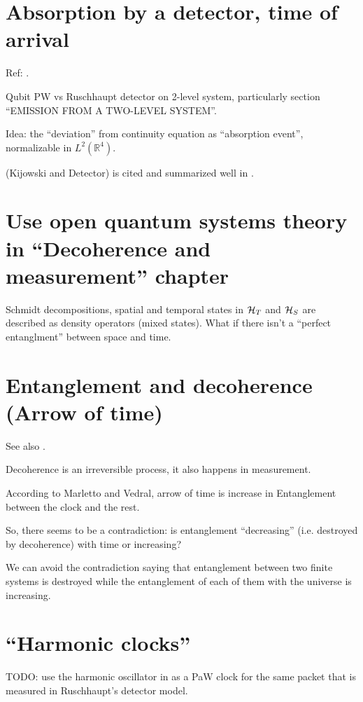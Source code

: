 \section{Absorption by a detector, time of arrival}
Ref: \cite{RuschhauptAbsorption}.

Qubit PW vs Ruschhaupt detector on 2-level system,
particularly section “EMISSION FROM A TWO-LEVEL SYSTEM”.

Idea: the ``deviation'' from continuity equation as ``absorption event'',
normalizable in $L^2(\mathbb{R}^4)$.

\cite{TQM2} (Kijowski and Detector) is cited and summarized well in
\cite{Halliwell_Detector}.

\section{Use open quantum systems theory in ``Decoherence and measurement'' chapter}
Schmidt decompositions, spatial and temporal states in
$\mathcal{H}_T$ and $\mathcal{H}_S$
are described as density operators
(mixed states). What if there isn't a ``perfect entanglment'' between space and time.

\section{Entanglement and decoherence (Arrow of time)}
See also \cite{EntanglementVsDecoherence}.

Decoherence is an irreversible process, it also happens in measurement.

According to Marletto and Vedral, arrow of time is increase in Entanglement
between the clock and the rest.

So, there seems to be a contradiction: is entanglement ``decreasing''
(i.e. destroyed by decoherence) with time
or increasing?

We can avoid the contradiction saying that
entanglement between two finite systems is
destroyed while the entanglement of each of them with the universe
is increasing.




\section{``Harmonic clocks''}

TODO: use the harmonic oscillator in \cite{HarmonicClocks}
as a PaW clock for the same packet that is measured in
Ruschhaupt's detector model.

